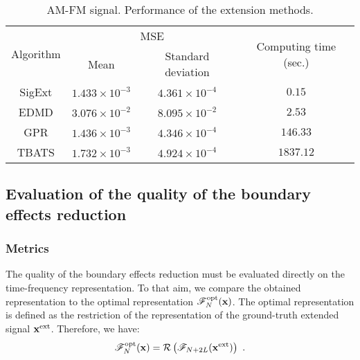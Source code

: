 \begin{table}
\centering
\caption{AM-FM signal. Performance of the extension methods.}
\begin{tabular}{|c||c|c|c|}
  \hline
   \multirow{2}{*}{Algorithm} & \multicolumn{2}{c|}{MSE}  & \multirow{2}{41pt}{Computing time (sec.)} \\
   \cline{2-3} & Mean & Standard deviation & \\
   \hhline{|=#=|=|=|}
   {\sf SigExt} & $1.433\times 10^{-3}$ & $4.361\times 10^{-4}$ & $0.15$ \\
   \hline
   EDMD & $3.076\times 10^{-2}$ & $8.095\times 10^{-2}$ & $2.53$\\
   \hline
   GPR & $1.436\times 10^{-3}$ & $4.346\times 10^{-4}$ & $146.33$ \\
   \hline
   TBATS & $1.732\times 10^{-3}$ & $4.924\times 10^{-4}$ & $1837.12$ \\
   \hline
\end{tabular}
\label{tab:mse.sine}
\end{table} 


\subsection{Evaluation of the quality of the boundary effects reduction}

\subsubsection{Metrics}
The quality of the boundary effects reduction must be evaluated directly on the time-frequency representation. To that aim, we compare the obtained representation to the optimal representation ${\mathscr F}_N^\mathrm{opt}({\mathbf x})$. The optimal representation is defined as the restriction of the representation of the ground-truth extended signal ${\mathbf x}^\mathrm{ext}$. Therefore, we have:
\begin{equation*}
{\mathscr F}_N^\mathrm{opt}({\mathbf x}) = {\mathcal R}\left( {\mathscr F}_{N+2L}({\mathbf x}^\mathrm{ext}) \right) \ .
\end{equation*} 


